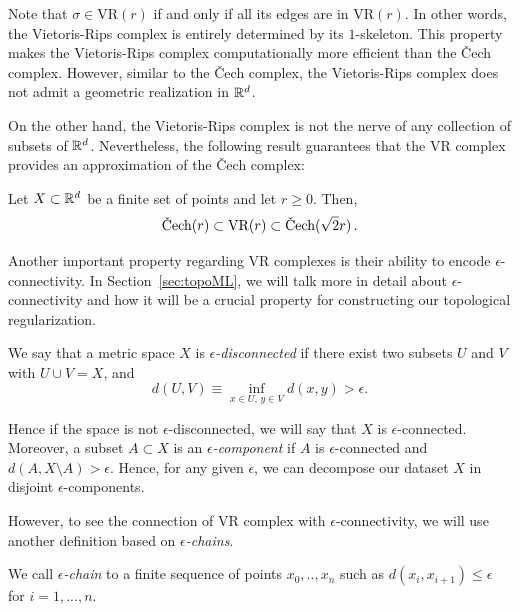 \documentclass[../main.tex]{subfiles}
\begin{document}
Note that $\sigma \in \text{VR}(r)$ if and only if all its edges are in $\text{VR}(r)$. In other words, the Vietoris-Rips complex is entirely determined by its $1$-skeleton. This property makes the Vietoris-Rips complex computationally more efficient than the \v{C}ech complex. However, similar to the \v{C}ech complex, the Vietoris-Rips complex does not admit a geometric realization in $\mathbb{R}^d$.

On the other hand, the Vietoris-Rips complex is not the nerve of any collection of subsets of $\mathbb{R}^d$. Nevertheless, the following result guarantees that the VR complex provides an approximation of the \v{C}ech complex:

\begin{lemma}
\label{fig:lemaVR}
Let $X \subset \mathbb{R}^d$ be a finite set of points and let $r \geq 0$. Then,
\[
\text{\rm \v{C}ech}(r) \subset \text{\rm VR}(r) \subset \text{\rm \v{C}ech}(\sqrt{2}r)\,.
\]
\end{lemma}

Another important property regarding VR complexes is their ability to encode $\epsilon$-connectivity. In Section~\ref{sec:topoML}, we will talk more in detail about $\epsilon$-connectivity and how it will be a crucial property for constructing our topological regularization. 

\begin{definition}
We say that a metric space $X$ is \emph{$\epsilon$-disconnected} if there exist two subsets $U$ and $V$ with $U\cup V = X$, and
\[d(U,V)\equiv \inf_{x\in U,\, y\in V}d(x,y) > \epsilon.\]    
\end{definition}
Hence if the space is not $\epsilon$-disconnected, we will say that $X$ is $\epsilon$-connected. Moreover, a subset $A \subset X$ is an \emph{$\epsilon$-component} if $A$ is $\epsilon$-connected and $d(A, {X \setminus A}) > \epsilon$. Hence, for any given $\epsilon$, we can decompose our dataset $X$ in disjoint $\epsilon$-components.

However, to see the connection of VR complex with $\epsilon$-connectivity, we will use another definition based on \emph{$\epsilon$-chains}.

\begin{definition}
We call \emph{$\epsilon$-chain} to a finite sequence of points $x_0, .., x_n$ such as $d(x_i, x_{i+1})\leq \epsilon$ for $i=1,...,n$. 
\end{definition}
\end{document}
